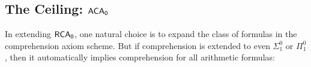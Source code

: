 \documentclass{amsart}
\begin{document}
	
	
	
	
	
	
	\subsection{The Ceiling: \texorpdfstring{$\operatorname{\sf{ACA_0}}$}{ACA}} In extending $\operatorname{\sf{RCA_0}}$, one natural choice is to expand the class of formulas in the comprehension axiom scheme. But if comprehension is extended to even $\Sigma_1^0$ or $\Pi_1^0$, then it automatically implies comprehension for all arithmetic formulas:\\
	
\end{document}

